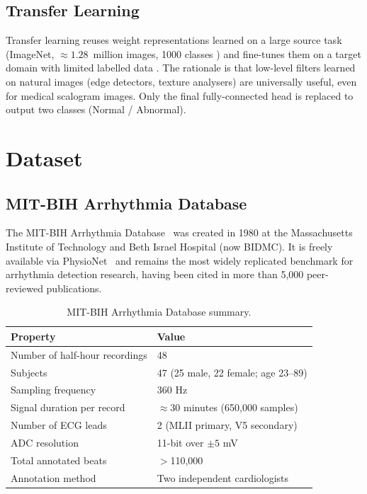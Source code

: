 \documentclass[12pt,a4paper]{article}
\begin{document}
\subsection{Transfer Learning}

Transfer learning reuses weight representations learned on a large source task
(ImageNet, $\approx 1.28$~million images, 1000 classes \cite{deng2009imagenet})
and fine-tunes them on a target domain with limited labelled data
\cite{pan2010transfer}.  The rationale is that low-level filters learned on
natural images (edge detectors, texture analysers) are universally useful, even
for medical scalogram images.  Only the final fully-connected head is replaced
to output two classes (Normal / Abnormal).

\section{Dataset}

\subsection{MIT-BIH Arrhythmia Database}

The MIT-BIH Arrhythmia Database~\cite{moody2001mitbih} was created in 1980 at
the Massachusetts Institute of Technology and Beth Israel Hospital (now BIDMC).
It is freely available via PhysioNet~\cite{goldberger2000physiobank} and
remains the most widely replicated benchmark for arrhythmia detection research,
having been cited in more than 5,000 peer-reviewed publications.

\begin{table}[H]
\centering
\caption{MIT-BIH Arrhythmia Database summary.}
\label{tab:mitbih}
\begin{tabular}{ll}
    \toprule
    \textbf{Property} & \textbf{Value} \\
    \midrule
    Number of half-hour recordings & 48 \\
    Subjects & 47 (25 male, 22 female; age 23--89) \\
    Sampling frequency & 360 Hz \\
    Signal duration per record & $\approx$30 minutes (650,000 samples) \\
    Number of ECG leads & 2 (MLII primary, V5 secondary) \\
    ADC resolution & 11-bit over $\pm 5$ mV \\
    Total annotated beats & $>$110,000 \\
    Annotation method & Two independent cardiologists \\
    \bottomrule
\end{tabular}
\end{table}
\end{document}
